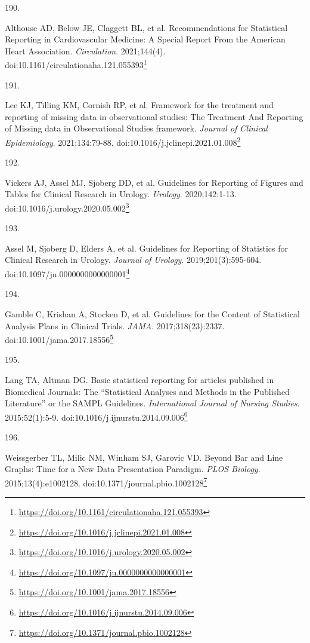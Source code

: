 \documentclass[
  a4paper,
]{book}
\newlength{\cslhangindent}
\newlength{\csllabelwidth}
\newlength{\cslentryspacingunit} %
\newenvironment{CSLReferences}[2] %
 {%
  \setlength{\parindent}{0pt}
  \ifodd #1
  \let\oldpar\par
  \def\par{\hangindent=\cslhangindent\oldpar}
  \fi
  \setlength{\parskip}{#2\cslentryspacingunit}
 }%
 {}
\newcommand{\CSLLeftMargin}[1]{\parbox[t]{\csllabelwidth}{#1}}
\newcommand{\CSLRightInline}[1]{\parbox[t]{\linewidth - \csllabelwidth}{#1}\break}
\renewcommand{\href}[2]{#2\footnote{\url{#1}}}
\begin{document}
\begin{CSLReferences}{0}{0}
\leavevmode{}%
\CSLLeftMargin{190. }%
\CSLRightInline{Althouse AD, Below JE, Claggett BL, et al. Recommendations for Statistical Reporting in Cardiovascular Medicine: A Special Report From the American Heart Association. \emph{Circulation}. 2021;144(4). doi:\href{https://doi.org/10.1161/circulationaha.121.055393}{10.1161/circulationaha.121.055393}}

\leavevmode{}%
\CSLLeftMargin{191. }%
\CSLRightInline{Lee KJ, Tilling KM, Cornish RP, et al. Framework for the treatment and reporting of missing data in observational studies: The Treatment And Reporting of Missing data in Observational Studies framework. \emph{Journal of Clinical Epidemiology}. 2021;134:79-88. doi:\href{https://doi.org/10.1016/j.jclinepi.2021.01.008}{10.1016/j.jclinepi.2021.01.008}}

\leavevmode{}%
\CSLLeftMargin{192. }%
\CSLRightInline{Vickers AJ, Assel MJ, Sjoberg DD, et al. Guidelines for Reporting of Figures and Tables for Clinical Research in Urology. \emph{Urology}. 2020;142:1-13. doi:\href{https://doi.org/10.1016/j.urology.2020.05.002}{10.1016/j.urology.2020.05.002}}

\leavevmode{}%
\CSLLeftMargin{193. }%
\CSLRightInline{Assel M, Sjoberg D, Elders A, et al. Guidelines for Reporting of Statistics for Clinical Research in Urology. \emph{Journal of Urology}. 2019;201(3):595-604. doi:\href{https://doi.org/10.1097/ju.0000000000000001}{10.1097/ju.0000000000000001}}

\leavevmode{}%
\CSLLeftMargin{194. }%
\CSLRightInline{Gamble C, Krishan A, Stocken D, et al. Guidelines for the Content of Statistical Analysis Plans in Clinical Trials. \emph{JAMA}. 2017;318(23):2337. doi:\href{https://doi.org/10.1001/jama.2017.18556}{10.1001/jama.2017.18556}}

\leavevmode{}%
\CSLLeftMargin{195. }%
\CSLRightInline{Lang TA, Altman DG. Basic statistical reporting for articles published in Biomedical Journals: The {``}Statistical Analyses and Methods in the Published Literature{''} or the SAMPL Guidelines. \emph{International Journal of Nursing Studies}. 2015;52(1):5-9. doi:\href{https://doi.org/10.1016/j.ijnurstu.2014.09.006}{10.1016/j.ijnurstu.2014.09.006}}

\leavevmode{}%
\CSLLeftMargin{196. }%
\CSLRightInline{Weissgerber TL, Milic NM, Winham SJ, Garovic VD. Beyond Bar and Line Graphs: Time for a New Data Presentation Paradigm. \emph{PLOS Biology}. 2015;13(4):e1002128. doi:\href{https://doi.org/10.1371/journal.pbio.1002128}{10.1371/journal.pbio.1002128}}


\end{CSLReferences}
\end{document}
